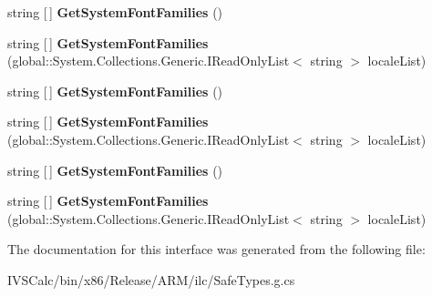 \begin{DoxyCompactItemize}
\item 
\mbox{\label{interface_microsoft_1_1_graphics_1_1_canvas_1_1_text_1_1_i_canvas_text_format_statics_a38383b6acac623c98fc1c00c699dd78d}} 
string \mbox{[}$\,$\mbox{]} {\bfseries Get\+System\+Font\+Families} ()
\item 
\mbox{\label{interface_microsoft_1_1_graphics_1_1_canvas_1_1_text_1_1_i_canvas_text_format_statics_af6596d230c097943c7738a65379972d8}} 
string \mbox{[}$\,$\mbox{]} {\bfseries Get\+System\+Font\+Families} (global\+::\+System.\+Collections.\+Generic.\+I\+Read\+Only\+List$<$ string $>$ locale\+List)
\item 
\mbox{\label{interface_microsoft_1_1_graphics_1_1_canvas_1_1_text_1_1_i_canvas_text_format_statics_a38383b6acac623c98fc1c00c699dd78d}} 
string \mbox{[}$\,$\mbox{]} {\bfseries Get\+System\+Font\+Families} ()
\item 
\mbox{\label{interface_microsoft_1_1_graphics_1_1_canvas_1_1_text_1_1_i_canvas_text_format_statics_af6596d230c097943c7738a65379972d8}} 
string \mbox{[}$\,$\mbox{]} {\bfseries Get\+System\+Font\+Families} (global\+::\+System.\+Collections.\+Generic.\+I\+Read\+Only\+List$<$ string $>$ locale\+List)
\item 
\mbox{\label{interface_microsoft_1_1_graphics_1_1_canvas_1_1_text_1_1_i_canvas_text_format_statics_a38383b6acac623c98fc1c00c699dd78d}} 
string \mbox{[}$\,$\mbox{]} {\bfseries Get\+System\+Font\+Families} ()
\item 
\mbox{\label{interface_microsoft_1_1_graphics_1_1_canvas_1_1_text_1_1_i_canvas_text_format_statics_af6596d230c097943c7738a65379972d8}} 
string \mbox{[}$\,$\mbox{]} {\bfseries Get\+System\+Font\+Families} (global\+::\+System.\+Collections.\+Generic.\+I\+Read\+Only\+List$<$ string $>$ locale\+List)
\end{DoxyCompactItemize}


The documentation for this interface was generated from the following file\+:\begin{DoxyCompactItemize}
\item 
I\+V\+S\+Calc/bin/x86/\+Release/\+A\+R\+M/ilc/Safe\+Types.\+g.\+cs\end{DoxyCompactItemize}
